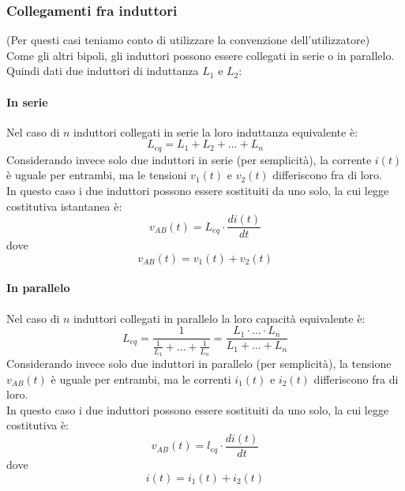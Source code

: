 \documentclass[../main.tex]{subfiles}
\begin{document}
	\subsubsection{Collegamenti fra induttori}
	(Per questi casi teniamo conto di utilizzare la convenzione dell'utilizzatore)\\
	Come gli altri bipoli, gli induttori possono essere collegati in serie o in parallelo.\\
	Quindi dati due induttori di induttanza $L_1$ e $L_2$:
	\paragraph{In serie}
	Nel caso di $n$ induttori collegati in serie la loro induttanza equivalente è:
	\begin{equation}
		L_{eq} = L_1 + L_2 + \dots + L_n 
	\end{equation}
	Considerando invece solo due induttori in serie (per semplicità), la corrente $i(t)$ è uguale per entrambi, ma le tensioni $v_1(t)$ e $v_2(t)$ differiscono fra di loro.\\
	In questo caso i due induttori possono essere sostituiti da uno solo, la cui legge costitutiva istantanea è:
	\begin{equation}
		v_{AB}(t) = L_{eq} \cdot \frac{di(t)}{dt}
	\end{equation}
	dove 
	\begin{equation}
		v_{AB}(t) = v_1(t) + v_2(t)
	\end{equation}
	\paragraph{In parallelo}
	Nel caso di $n$ induttori collegati in parallelo la loro capacità equivalente è:
	\begin{equation}
		L_{eq} = \frac{1}{\frac{1}{L_1} + \dots + \frac{1}{L_n}} = \frac{L_1 \cdot \dots \cdot L_n}{L_1 + \dots + L_n}
	\end{equation}
	Considerando invece solo due induttori in parallelo (per semplicità), la tensione $v_{AB}(t)$ è uguale per entrambi, ma le correnti $i_1(t)$ e $i_2(t)$ differiscono fra di loro.\\
	In questo caso i due induttori possono essere sostituiti da uno solo, la cui legge costitutiva è:
	\begin{equation}
		v_{AB}(t) = l_{eq} \cdot \frac{di(t)}{dt}
	\end{equation}
	dove 
	\begin{equation}
		i(t) = i_1(t) + i_2(t)
	\end{equation}
\end{document}

